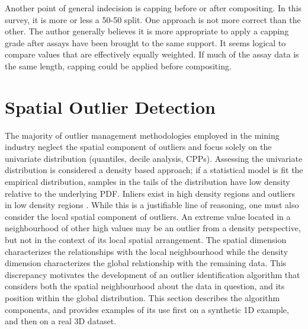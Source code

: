 Another point of general indecision is capping before or after compositing. In this survey, it is more or less a 50-50 split. One approach is not more correct than the other. The author generally believes it is more appropriate to apply a capping grade after assays have been brought to the same support. It seems logical to compare values that are effectively equally weighted. If much of the assay data is the same length, capping could be applied before compositing.

\FloatBarrier
\section{Spatial Outlier Detection}
\label{sec:02spatial}

The majority of outlier management methodologies employed in the mining industry neglect the spatial component of outliers and focus solely on the univariate distribution (quantiles, decile analysis, \glspl{CPP}). Assessing the univariate distribution is considered a density based approach; if a statistical model is fit the empirical distribution, samples in the tails of the distribution have low density relative to the underlying \gls{PDF}. Inliers exist in high density regions and outliers in low density regions \citep{geron2019hands}. While this is a justifiable line of reasoning, one must also consider the local spatial component of outliers. An extreme value located in a neighbourhood of other high values may be an outlier from a density perspective, but not in the context of its local spatial arrangement. The spatial dimension characterizes the relationships with the local neighbourhood while the density dimension characterizes the global relationship with the remaining data. This discrepancy motivates the development of an outlier identification algorithm that considers both the spatial neighbourhood about the data in question, and its position within the global distribution. This section describes the algorithm components, and provides examples of its use first on a synthetic \gls{1D} example, and then on a real \gls{3D} dataset.

